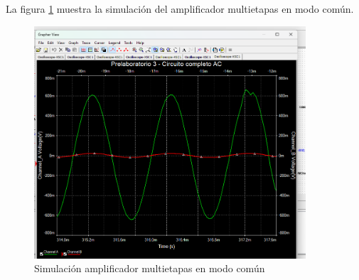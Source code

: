 La figura \ref{fig:sim-amp-multietapas-mod-comun} muestra la simulación del amplificador multietapas en modo común.

\begin{figure}[ht]
    \centering
    \includegraphics[width=0.9\textwidth]{src/images/p3/multietapa-modo-comun-ganancia.png}
    \caption{Simulación amplificador multietapas en modo común}
    \label{fig:sim-amp-multietapas-mod-comun}
\end{figure}
